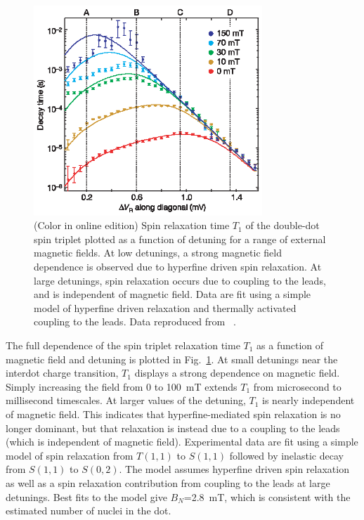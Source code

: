 \documentclass[12pt,aps,nofootinbib]{revtex4-1}
\begin{document}
\begin{figure}[tb]
\includegraphics[width=8.6cm]{hanson_fig40.eps}
\caption{(Color in online edition) Spin relaxation time $T_1$ of the double-dot spin triplet plotted as a
function of detuning for a range of external magnetic fields. At
low detunings, a strong magnetic field dependence is observed due
to hyperfine driven spin relaxation. At large detunings, spin
relaxation occurs due to coupling to the leads, and is independent
of magnetic field. Data are fit using a simple model of hyperfine
driven relaxation and thermally activated coupling to the leads. Data
reproduced from ~\textcite{johnson05}.}
\label{Fig:Johnson:Decay}
\end{figure}

The full dependence of the spin triplet relaxation time $T_1$ as a function
of magnetic field and detuning is plotted in Fig.\
\ref{Fig:Johnson:Decay}. At small detunings near the interdot
charge transition, $T_1$ displays a strong dependence on magnetic field. Simply increasing the field from 0 to 100~mT extends
$T_1$ from microsecond to millisecond timescales. At
larger values of the detuning, $T_1$ is nearly independent of magnetic field. This indicates that hyperfine-mediated spin relaxation is no longer dominant, but that relaxation is instead due to a coupling to the leads (which is independent of magnetic field). Experimental data are fit using a simple
model of spin relaxation from $T(1,1)$ to $S(1,1)$ followed by
inelastic decay from $S(1,1)$ to $S(0,2)$. The model assumes
hyperfine driven spin relaxation as well as a spin relaxation
contribution from coupling to the leads at large detunings. Best
fits to the model give $B_{N}$=2.8~mT, which is consistent with the
estimated number of nuclei in the dot.

\end{document}
